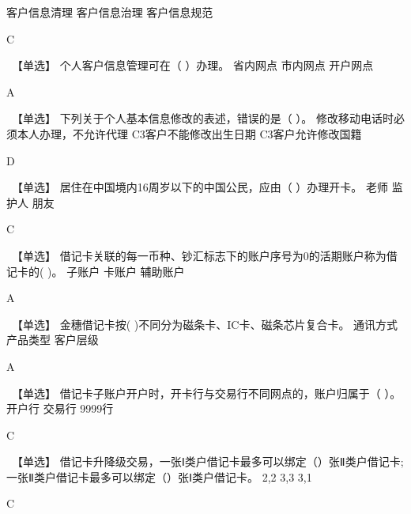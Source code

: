 \documentclass[kindlepaper]{BHCexam4kindle}
\begin{document}
\begin{questions}
 {  客户信息清理 } { 客户信息治理 } { 客户信息规范 }
\begin{solution} C \end{solution}
\qs　【单选】 个人客户信息管理可在（  ）办理。 \xx
{} {  省内网点 } { 市内网点 } { 开户网点 }
\begin{solution} A \end{solution}
\qs　【单选】 下列关于个人基本信息修改的表述，错误的是（  ）。 \xx
{} {  修改移动电话时必须本人办理，不允许代理 } { C3客户不能修改出生日期 } { C3客户允许修改国籍 }
\begin{solution} D \end{solution}
\qs　【单选】 居住在中国境内16周岁以下的中国公民，应由（   ）办理开卡。 \xx
{} {  老师 } { 监护人 } { 朋友 }
\begin{solution} C \end{solution}
\qs　【单选】 借记卡关联的每一币种、钞汇标志下的账户序号为0的活期账户称为借记卡的(    )。 \xx
{} {  子账户 } { 卡账户 } { 辅助账户 }
\begin{solution} A \end{solution}
\qs　【单选】 金穗借记卡按(    )不同分为磁条卡、IC卡、磁条芯片复合卡。 \xx
{} {  通讯方式 } { 产品类型 } { 客户层级 }
\begin{solution} A \end{solution}
\qs　【单选】 借记卡子账户开户时，开卡行与交易行不同网点的，账户归属于（   ）。 \xx
{} {  开户行 } { 交易行 } { 9999行 }
\begin{solution} C \end{solution}
\qs　【单选】 借记卡升降级交易，一张Ⅰ类户借记卡最多可以绑定（）张Ⅱ类户借记卡; 一张Ⅱ类户借记卡最多可以绑定（）张Ⅰ类户借记卡。 \xx
{} {  2,2 } { 3,3 } { 3,1 }
\begin{solution} C \end{solution}

\end{questions}
\end{document}
